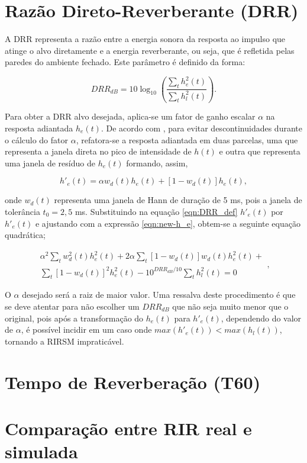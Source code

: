 \section{Razão Direto-Reverberante (DRR)}

A DRR representa a razão entre a energia sonora da resposta ao impulso que atinge o alvo diretamente e a energia reverberante,
ou seja, que é refletida pelas paredes do ambiente fechado. Este parâmetro é definido da forma:

\begin{equation} \label{eqn:DRR_def}
    DRR_{dB} = 10 \log_{10} \left( \frac{\sum_t h^2_e(t)}{\sum_t h^2_l(t)} \right).
\end{equation}

Para obter a DRR alvo desejada, aplica-se um fator de ganho escalar $\alpha$ na resposta adiantada $h_e(t)$.
De acordo com \cite{RIR_Data_Aug}, para evitar descontinuidades durante o cálculo do fator $\alpha$, refatora-se a
resposta adiantada em duas parcelas, uma que representa a janela direta no pico de intensidade de $h(t)$ e outra
que representa uma janela de resíduo de $h_e(t)$ formando, assim,

\begin{equation} \label{eqn:new-h_e}
    h'_e(t) = \alpha w_d(t) h_e(t) + [1 - w_d(t)]h_e(t),
\end{equation}

\noindent
onde $w_d(t)$ representa uma janela de Hann de duração de 5 ms, pois a janela de tolerância $t_0 = 2,5$ ms.
Substituindo na equação \ref{eqn:DRR_def} $h'_e(t)$ por $h'_e(t)$ e ajustando com a expressão \ref{eqn:new-h_e}, obtem-se
a seguinte equação quadrática;

\begin{equation} \label{eqn:DRR_quad_eqn}
    \begin{aligned} 
        \alpha^2 \sum_t w^2_d(t) h^2_e(t) +
        2 \alpha \sum_t [1 - w_d(t)] w_d(t) h^2_e(t) + \\
        \sum_t [1 - w_d(t)]^2 h^2_e(t) -
        10^{DRR_{dB}/10} \sum_t h^2_l(t)
        = 0
    \end{aligned}    
    ,
\end{equation}

O $\alpha$ desejado será a raiz de maior valor. 
Uma ressalva deste procedimento é que se deve atentar para não escolher um $DRR_{dB}$ que não seja muito menor que o original,
pois após a transformação do $h_e(t)$ para $h'_e(t)$, dependendo do valor de $\alpha$, é possível incidir em um caso onde
$max(h'_e(t)) < max(h_l(t))$, tornando a RIRSM impraticável.


\section{Tempo de Reverberação (T60)}

\section{Comparação entre RIR real e simulada}